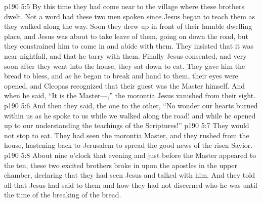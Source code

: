 \vs p190 5:5 By this time they had come near to the village where these brothers dwelt. Not a word had these two men spoken since Jesus began to teach them as they walked along the way. Soon they drew up in front of their humble dwelling place, and Jesus was about to take leave of them, going on down the road, but they constrained him to come in and abide with them. They insisted that it was near nightfall, and that he tarry with them. Finally Jesus consented, and very soon after they went into the house, they sat down to eat. They gave him the bread to bless, and as he began to break and hand to them, their eyes were opened, and Cleopas recognized that their guest was the Master himself. And when he said, “It is the Master---,” the morontia Jesus vanished from their sight.
\vs p190 5:6 And then they said, the one to the other, “No wonder our hearts burned within us as he spoke to us while we walked along the road! and while he opened up to our understanding the teachings of the Scriptures!”\plusone
\vs p190 5:7 They would not stop to eat. They had seen the morontia Master, and they rushed from the house, hastening back to Jerusalem to spread the good news of the risen Savior.
\vs p190 5:8 About nine o’clock that evening and just before the Master appeared to the ten, these two excited brothers broke in upon the apostles in the upper chamber, declaring that they had seen Jesus and talked with him. And they told all that Jesus had said to them and how they had not discerned who he was until the time of the breaking of the bread.
